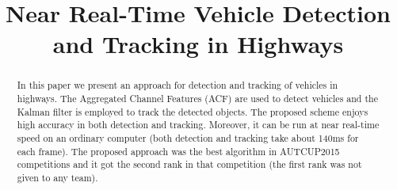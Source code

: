\documentclass[conference]{IEEEtran}
\begin{document}
%
\title{Near Real-Time Vehicle Detection and Tracking in Highways}


\author{
\and
{}
\and
{}
}



\maketitle



\begin{abstract}
	In this paper we present an approach for detection and tracking of vehicles in highways. The Aggregated Channel Features (ACF) are used to detect vehicles and the Kalman filter is employed to track the detected objects. The proposed scheme enjoys high accuracy in both detection and tracking. Moreover, it can be run at near real-time speed on an ordinary computer (both detection and tracking take about 140ms for each frame). The proposed approach was the best algorithm in AUTCUP2015 competitions and it got the second rank in that competition (the first rank was not given to any team).
\end{abstract}





%
\IEEEpeerreviewmaketitle
\end{document}
